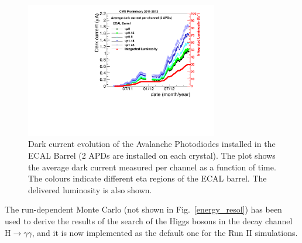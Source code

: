 \documentclass[journal]{IEEEtran}
\begin{document}
\begin{figure}[!t]
  \begin{center}
    \includegraphics[width=3.3in]{HV_avg_history}
    \caption{Dark current evolution of the Avalanche Photodiodes installed in the ECAL Barrel (2 APDs are installed on each crystal). The plot shows the average dark current measured per channel as a function of time. The colours indicate different eta regions of the ECAL barrel. The delivered luminosity is also shown. \label{fig:idark}}
  \end{center}
\end{figure}
%
The run-dependent Monte Carlo (not shown in Fig.~\ref{energy_resol}) has been used to derive the results of the search of the Higgs bosons in the decay channel H$\to\gamma\gamma$, and it is now implemented as the default one for the Run II simulations. 
\end{document}
